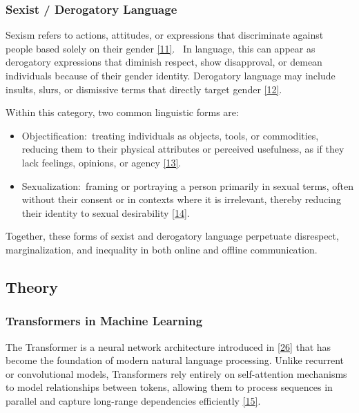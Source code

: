 \documentclass[12pt,oneside,openright,a4paper]{cpe-english-project}
\begin{document}
\subsubsection{Sexist / Derogatory Language}

Sexism refers to actions, attitudes, or expressions that discriminate against people based solely on their gender \hyperlink{bib:ref11}{[11]}. ~In language, this can appear as derogatory expressions that diminish respect, show disapproval, or demean individuals because of their gender identity. Derogatory language may include insults, slurs, or dismissive terms that directly target gender \hyperlink{bib:ref12}{[12]}.

Within this category, two common linguistic forms are:

\begin{itemize}
\item
  {Objectification:~treating individuals as objects, tools, or commodities, reducing them to their physical attributes or perceived usefulness, as if they lack feelings, opinions, or agency \hyperlink{bib:ref13}{[13]}. }
\item
  {Sexualization:~framing or portraying a person primarily in sexual terms, often without their consent or in contexts where it is irrelevant, thereby reducing their identity to sexual desirability \hyperlink{bib:ref14}{[14]}.}
\end{itemize}

Together, these forms of sexist and derogatory language perpetuate disrespect, marginalization, and inequality in both online and offline communication.

\subsection{Theory}

\subsubsection{Transformers in Machine Learning}

The Transformer is a neural network architecture introduced in \hyperlink{bib:ref26}{[26]} that has become the foundation of modern natural language processing. Unlike recurrent or convolutional models, Transformers rely entirely on self-attention mechanisms to model relationships between tokens, allowing them to process sequences in parallel and capture long-range dependencies efficiently \hyperlink{bib:ref15}{[15]}.
\end{document}
